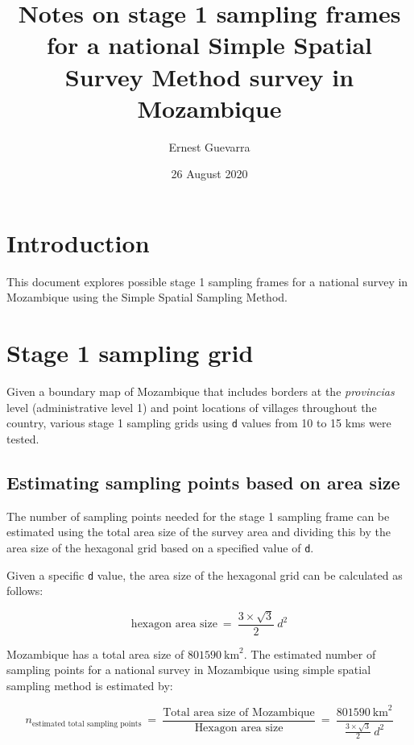 \documentclass[
  12pt,
  a4paper]{article}
\title{\vspace{8cm} Notes on stage 1 sampling frames for a national Simple Spatial Survey Method survey in Mozambique}
\author{Ernest Guevarra}
\date{26 August 2020}
\begin{document}
\maketitle

\newpage

\newpage

\hypertarget{introduction}{%
\section{Introduction}\label{introduction}}

This document explores possible stage 1 sampling frames for a national survey in Mozambique using the Simple Spatial Sampling Method.

\hypertarget{stage-1-sampling-grid}{%
\section{Stage 1 sampling grid}\label{stage-1-sampling-grid}}

Given a boundary map of Mozambique that includes borders at the \emph{provincias} level (administrative level 1) and point locations of villages throughout the country, various stage 1 sampling grids using \texttt{d} values from 10 to 15 kms were tested.

\hypertarget{estimating-sampling-points-based-on-area-size}{%
\subsection{Estimating sampling points based on area size}\label{estimating-sampling-points-based-on-area-size}}

The number of sampling points needed for the stage 1 sampling frame can be estimated using the total area size of the survey area and dividing this by the area size of the hexagonal grid based on a specified value of \texttt{d}.

Given a specific \texttt{d} value, the area size of the hexagonal grid can be calculated as follows:

\[ \text{hexagon area size} ~ = ~ \frac{3 \times \sqrt{3}}{2} ~ d ^ 2  \]

Mozambique has a total area size of \(801590 ~ \text{km} ^ 2\). The estimated number of sampling points for a national survey in Mozambique using simple spatial sampling method is estimated by:

\[ n_\text{estimated total sampling points} ~ = ~ \frac{\text{Total area size of Mozambique}}{\text{Hexagon area size}} ~ = ~ \frac{801590 ~ \text{km} ^ 2}{\frac{3 \times \sqrt{3}}{2} ~ d ^ 2} \]
\end{document}
